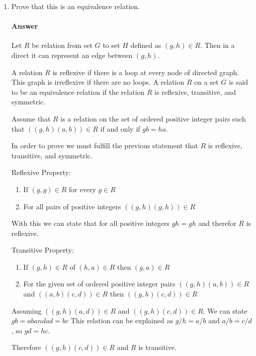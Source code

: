 \documentclass{article}
\begin{document}
\begin{enumerate}

    \item Prove that this is an equivalence relation.

        \paragraph{Answer}

        Let $R$ be relation from set $G$ to set $H$ defined as $(g,h) \in R$. Then in a direct it can represent an edge between $(g,h)$.
        
        A relation $R$ is reflexive if there is a loop at every node of directed graph. This graph is irreflexive if there are no loops.
        A relation $R$ on a set $G$ is said to be an equivalence relation if the relation $R$ is reflexive, transitive, and symmetric.
        
        Assume that $R$ is a relation on the set of ordered positive integer pairs such that $((g,h) (a,b)) \in R$ if and only if $gb=ha$.

        In order to prove we must fulfill the previous statement that $R$ is reflexive, transitive, and symmetric.

        Reflexive Property:
        \begin{enumerate}
            \item If $(g,g) \in R$ for every $g \in R$ 
            \item For all pairs of positive integers $((g,h)(g,h)) \in R$
        \end{enumerate}
        With this we can state that for all positive integers $gh = gh$ and therefor $R$ is reflexive.

        Transitive Property:
        \begin{enumerate}
            \item If $(g,h) \in R$ of $(h,a) \in R$ then $(g,a) \in R$
            \item For the given set of ordered positive integer pairs $((g,h) (a,b)) \in R$ and $((a,b) (c,d)) \in R$ then $((g,h) (c,d)) \in R$
        \end{enumerate}

        Assuming $((g,h) (a,d)) \in R$ and $((g,h) (c,d)) \in R$. We can state $gb=ab and ad=bc$
        This relation can be explained as $g/h=a/b$ and $a/b=c/d$, so $gd=hc$.
        
        Therefore $((g,h) (c,d)) \in R$ and $R$ is transitive.


\end{enumerate}
\end{document}
